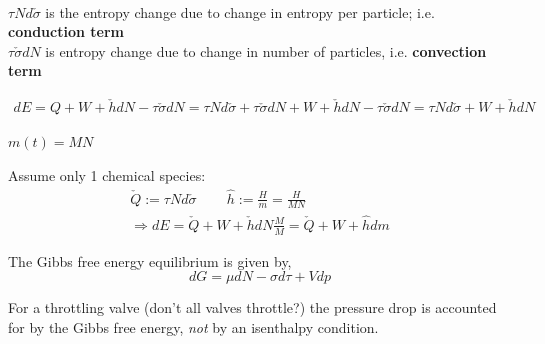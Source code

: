 \quad \\ 
$\tau N d\check{\sigma}$ is the entropy change due to change in entropy per particle; i.e. \textbf{conduction term} \\
$\tau \check{\sigma} dN$ is entropy change due to change in number of particles, i.e. \textbf{convection term}

\[
\begin{gathered}
dE = Q + W + \check{h} dN - \tau \check{\sigma} dN = \tau N d\check{\sigma} + \tau \check{\sigma} dN + W + \check{h} dN - \tau \check{\sigma} dN = \tau N d\check{\sigma} + W + \check{h} dN
\end{gathered}
\]

$m(t) = MN$

Assume only 1 chemical species:
\[
\begin{gathered}
	\check{Q} := \tau N d\check{\sigma} \qquad \, \widehat{h} := \frac{H}{m} = \frac{H}{MN} \\ 
 \Longrightarrow dE = \check{Q} + W + \check{h} dN \frac{M}{M} = \check{Q} + W + \widehat{h} dm
\end{gathered}
\]

The Gibbs free energy equilibrium is given by, 
\[
dG = \mu dN - \sigma d\tau + V dp
\]

For a throttling valve (don't all valves throttle?) the pressure drop is accounted for by the Gibbs free energy, \emph{not} by an isenthalpy condition. 

